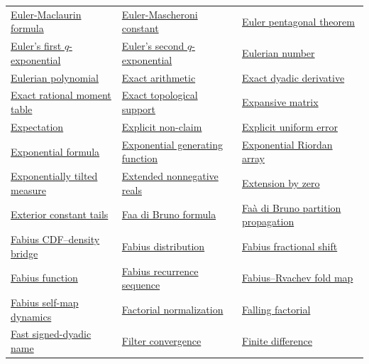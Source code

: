 \documentclass[11pt,oneside]{article}
\begin{document}
\begin{longtable}{L{0.31\textwidth}L{0.31\textwidth}L{0.31\textwidth}}
\hyperlink{gls:euler-maclaurin-formula}{Euler-Maclaurin formula} & \hyperlink{gls:euler-mascheroni-constant}{Euler-Mascheroni constant} & \hyperlink{gls:euler-pentagonal-theorem}{Euler pentagonal theorem} \\
\hyperlink{gls:euler-first-q-exponential}{Euler's first \(q\)-exponential} & \hyperlink{gls:euler-second-q-exponential}{Euler's second \(q\)-exponential} & \hyperlink{gls:eulerian-number}{Eulerian number} \\
\hyperlink{gls:eulerian-polynomial}{Eulerian polynomial} & \hyperlink{gls:exact-arithmetic}{Exact arithmetic} & \hyperlink{gls:exact-dyadic-derivative}{Exact dyadic derivative} \\
\hyperlink{gls:exact-rational-moment-table}{Exact rational moment table} & \hyperlink{gls:exact-topological-support}{Exact topological support} & \hyperlink{gls:expansive-matrix}{Expansive matrix} \\
\hyperlink{gls:expectation}{Expectation} & \hyperlink{gls:nonclaim}{Explicit non-claim} & \hyperlink{gls:explicit-uniform-error}{Explicit uniform error} \\
\hyperlink{gls:exponential-formula}{Exponential formula} & \hyperlink{gls:exponential-generating-function}{Exponential generating function} & \hyperlink{gls:exponential-riordan-array}{Exponential Riordan array} \\
\hyperlink{gls:tilted-measure}{Exponentially tilted measure} & \hyperlink{gls:extended-nonnegative-reals}{Extended nonnegative reals} & \hyperlink{gls:extension-by-zero}{Extension by zero} \\
\hyperlink{gls:exterior-constant-tails}{Exterior constant tails} & \hyperlink{gls:faa-di-bruno-formula}{Faa di Bruno formula} & \hyperlink{gls:faa-di-bruno-partition-propagation}{Fa\`a di Bruno partition propagation} \\
\hyperlink{gls:cdf-density-bridge}{Fabius CDF--density bridge} & \hyperlink{gls:fabius-distribution}{Fabius distribution} & \hyperlink{gls:fabius-fractional-shift}{Fabius fractional shift} \\
\hyperlink{gls:fabius-function}{Fabius function} & \hyperlink{gls:fabius-recurrence-sequence}{Fabius recurrence sequence} & \hyperlink{gls:fabius-fold-map}{Fabius--Rvachev fold map} \\
\hyperlink{gls:fabius-self-map-dynamics}{Fabius self-map dynamics} & \hyperlink{gls:factorial-normalization}{Factorial normalization} & \hyperlink{gls:falling-factorial}{Falling factorial} \\
\hyperlink{gls:fast-signed-dyadic-name}{Fast signed-dyadic name} & \hyperlink{gls:filter-convergence}{Filter convergence} & \hyperlink{gls:finite-difference}{Finite difference} \\

\end{longtable}
\end{document}
